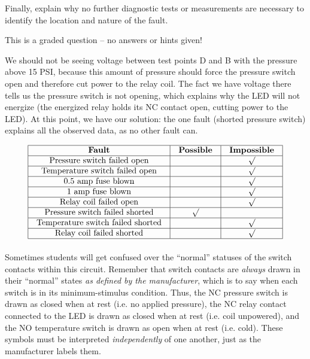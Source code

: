 Finally, explain why no further diagnostic tests or measurements are necessary to identify the location and nature of the fault.

\vfil 

\eject






This is a graded question -- no answers or hints given!







We should not be seeing voltage between test points D and B with the pressure above 15 PSI, because this amount of pressure should force the pressure switch open and therefore cut power to the relay coil.  The fact we have voltage there tells us the pressure switch is not opening, which explains why the LED will not energize (the energized relay holds its NC contact open, cutting power to the LED).  At this point, we have our solution: the one fault (shorted pressure switch) explains all the observed data, as no other fault can.


$$\vbox{\offinterlineskip
\halign{\strut
\vrule \quad\hfil # \ \hfil & 
\vrule \quad\hfil # \ \hfil & 
\vrule \quad\hfil # \ \hfil \vrule \cr
\noalign{\hrule}
%
{\bf Fault} & {\bf Possible} & {\bf Impossible} \cr
%
\noalign{\hrule}
%
Pressure switch failed open &  & $\surd$ \cr
%
\noalign{\hrule}
%
Temperature switch failed open &  & $\surd$ \cr
%
\noalign{\hrule}
%
0.5 amp fuse blown &  & $\surd$ \cr
%
\noalign{\hrule}
%
1 amp fuse blown &  & $\surd$ \cr
%
\noalign{\hrule}
%
Relay coil failed open &  & $\surd$ \cr
%
\noalign{\hrule}
%
Pressure switch failed shorted & $\surd$ &  \cr
%
\noalign{\hrule}
%
Temperature switch failed shorted &  & $\surd$ \cr
%
\noalign{\hrule}
%
Relay coil failed shorted &  & $\surd$ \cr
%
\noalign{\hrule}
} %
}$$ %

Sometimes students will get confused over the ``normal'' statuses of the switch contacts within this circuit.  Remember that switch contacts are {\it always} drawn in their ``normal'' states {\it as defined by the manufacturer}, which is to say when each switch is in its minimum-stimulus condition.  Thus, the NC pressure switch is drawn as closed when at rest (i.e. no applied pressure), the NC relay contact connected to the LED is drawn as closed when at rest (i.e. coil unpowered), and the NO temperature switch is drawn as open when at rest (i.e. cold).  These symbols must be interpreted {\it independently} of one another, just as the manufacturer labels them.  

